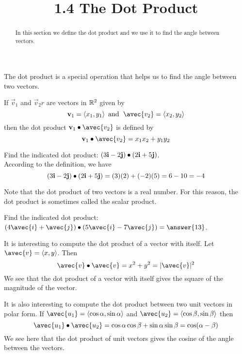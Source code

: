 \documentclass[handout]{ximera}
\title{1.4 The Dot Product}
\begin{document}
\begin{abstract}
In this section we define the dot product and we use it to find the angle between vectors.
\end{abstract}
 
\maketitle
The dot product is a special operation that helps us to find the angle between two vectors.
\begin{definition}
If $\vec{v}_1$ and $\vec{v}_2r$ are vectors in $\mathbb R^2$ given by
\[
\vec{v}_1 = \vector{x_1, y_1} \text{  and   } \;\avec{v_2} = \vector{x_2, y_2}
\]
then the dot product $\vec{v}_1 \dotp \avec{v_2}$ is defined by
\[
\vec{v}_1 \dotp \avec{v_2} = x_1x_2 + y_1y_2
\]
\end{definition}

\begin{example}
Find the indicated dot product: $\left(3\mathbf{i} -2\mathbf{j}\right) \bullet \left(2\mathbf{i} +5\mathbf{j}\right)$.\\
According to the definition, we have
\[
\left(3\mathbf{i} -2\mathbf{j}\right) \bullet \left(2\mathbf{i} +5\mathbf{j}\right) = (3)(2)+(-2)(5) = 6-10 = -4
\]
\end{example}

Note that the dot product of two vectors is a real number.  For this reason, the dot product is sometimes called the scalar product.

\begin{problem}
Find the indicated dot product: $\left(4\avec{i} + \avec{j}\right) \dotp \left(5\avec{i} -7\avec{j}\right) =\answer{13}$.\\
\end{problem}

It is interesting to compute the dot product of a vector with itself.  Let $\avec{v} = \vector{x, y}$. Then
\[
\avec{v} \dotp \avec{v} = x^2 + y^2 = |\avec{v}|^2
\]
We see that the dot product of a vector with itself gives the square of the magnitude of the vector.

It is also interesting to compute the dot product between two unit vectors in polar form.
If $\avec{u_1} = \vector{\cos \alpha, \sin \alpha}$ and $\avec{u_2} = \vector{\cos \beta, \sin \beta}$ then
\[
\avec{u_1} \dotp \avec{u_2} = \cos \alpha \cos \beta + \sin \alpha \sin \beta = \cos(\alpha - \beta)
\]
We see here that the dot product of unit vectors gives the cosine of the angle between the vectors.
\end{document}
